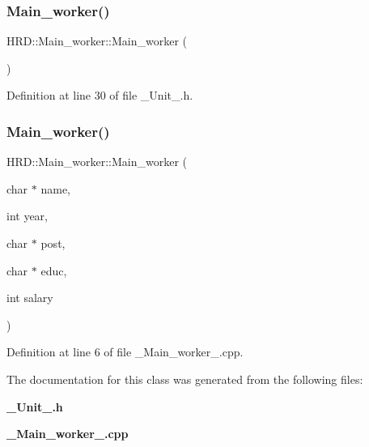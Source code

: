 \subsubsection{Main\+\_\+worker()\hspace{0.1cm}{\footnotesize\ttfamily [1/2]}}
{\footnotesize\ttfamily H\+R\+D\+::\+Main\+\_\+worker\+::\+Main\+\_\+worker (\begin{DoxyParamCaption}{ }\end{DoxyParamCaption})\hspace{0.3cm}{\ttfamily [inline]}}



Definition at line 30 of file \+\_\+\+Unit\+\_\+.\+h.

\mbox{\label{class_h_r_d_1_1_main__worker_a9a4c8c4a1a4cfe45db19555fe5dd3932}} 
\subsubsection{Main\+\_\+worker()\hspace{0.1cm}{\footnotesize\ttfamily [2/2]}}
{\footnotesize\ttfamily H\+R\+D\+::\+Main\+\_\+worker\+::\+Main\+\_\+worker (\begin{DoxyParamCaption}\item[{char $\ast$}]{name,  }\item[{int}]{year,  }\item[{char $\ast$}]{post,  }\item[{char $\ast$}]{educ,  }\item[{int}]{salary }\end{DoxyParamCaption})}



Definition at line 6 of file \+\_\+\+Main\+\_\+worker\+\_\+.\+cpp.



The documentation for this class was generated from the following files\+:\begin{DoxyCompactItemize}
\item 
\textbf{ \+\_\+\+Unit\+\_\+.\+h}\item 
\textbf{ \+\_\+\+Main\+\_\+worker\+\_\+.\+cpp}\end{DoxyCompactItemize}
